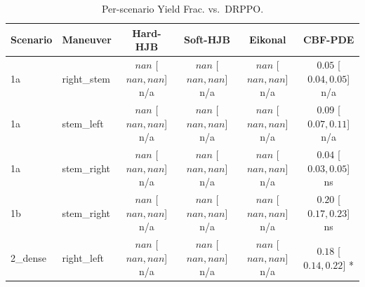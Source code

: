 \begin{table}[ht]
\centering
\caption{Per-scenario Yield Frac. vs.\ DRPPO.}
\label{tab:per_scenario_action_yield_frac}
\begin{tabular}{llcccc}
\toprule
Scenario & Maneuver & Hard-HJB & Soft-HJB & Eikonal & CBF-PDE \\
\midrule
1a & right_stem & $nan$ [$nan, nan$] n/a & $nan$ [$nan, nan$] n/a & $nan$ [$nan, nan$] n/a & $0.05$ [$0.04, 0.05$] n/a \\
1a & stem_left & $nan$ [$nan, nan$] n/a & $nan$ [$nan, nan$] n/a & $nan$ [$nan, nan$] n/a & $0.09$ [$0.07, 0.11$] n/a \\
1a & stem_right & $nan$ [$nan, nan$] n/a & $nan$ [$nan, nan$] n/a & $nan$ [$nan, nan$] n/a & $0.04$ [$0.03, 0.05$] ns \\
1b & stem_right & $nan$ [$nan, nan$] n/a & $nan$ [$nan, nan$] n/a & $nan$ [$nan, nan$] n/a & $0.20$ [$0.17, 0.23$] ns \\
2_dense & right_left & $nan$ [$nan, nan$] n/a & $nan$ [$nan, nan$] n/a & $nan$ [$nan, nan$] n/a & $0.18$ [$0.14, 0.22$] * \\
\bottomrule
\end{tabular}
\end{table}
